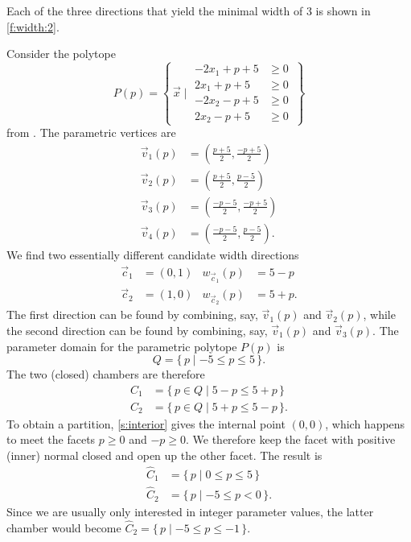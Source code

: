 \begin{example}
Each of the three directions that yield the minimal
width of 3 is shown in \autoref{f:width:2}.
\end{example}

\begin{example} \label{ex:width:2}
Consider the polytope
$$
P(p) = \left\{\,
\vec x \mid
\begin{aligned}
-2 x_1 + p + 5 &\ge 0 \\
2 x_1 + p + 5 &\ge 0 \\
-2 x_2 - p + 5 &\ge 0 \\
2 x_2 - p + 5 &\ge 0
\end{aligned}
\,\right\}
$$
from .
The parametric vertices are
$$
\begin{aligned}
\vec v_1(p) & = \left(\frac{p+5}2, \frac{-p+5}2\right) \\
\vec v_2(p) & = \left(\frac{p+5}2, \frac{p-5}2\right) \\
\vec v_3(p) & = \left(\frac{-p-5}2, \frac{-p+5}2\right) \\
\vec v_4(p) & = \left(\frac{-p-5}2, \frac{p-5}2\right)
.
\end{aligned}
$$
We find two essentially different candidate width directions
$$
\begin{aligned}
\vec c_1 &= (0,1) & w_{\vec c_1}(p) &= 5-p \\
\vec c_2 &= (1,0) & w_{\vec c_2}(p) &= 5+p
.
\end{aligned}
$$
The first direction can be found by combining, say,
$\vec v_1(p)$ and $\vec v_2(p)$, while the second direction can be
found by combining, say, $\vec v_1(p)$ and $\vec v_3(p)$.
The parameter domain for the parametric polytope $P(p)$ is
$$
Q = \{\, p \mid -5 \le p \le 5 \,\}
.
$$
The two (closed) chambers are therefore
$$
\begin{aligned}
C_1 &= \{\, p \in Q \mid 5 - p \le 5+p \,\} \\
C_2 &= \{\, p \in Q \mid 5 + p \le 5-p \,\}
.
\end{aligned}
$$
To obtain a partition, \autoref{s:interior} gives
the internal point $(0,0)$, which happens to meet
the facets $p \ge 0$ and $-p \ge 0$.  We therefore
keep the facet with positive (inner) normal closed
and open up the other facet.  The result is
$$
\begin{aligned}
\hat C_1 &= \{\, p \mid 0 \le p \le 5 \,\} \\
\hat C_2 &= \{\, p \mid -5 \le p < 0 \,\}
.
\end{aligned}
$$
Since we are usually only interested in integer parameter
values, the latter chamber would become
$\hat C_2 = \{\, p \mid -5 \le p \le -1 \,\}$.
\end{example}

